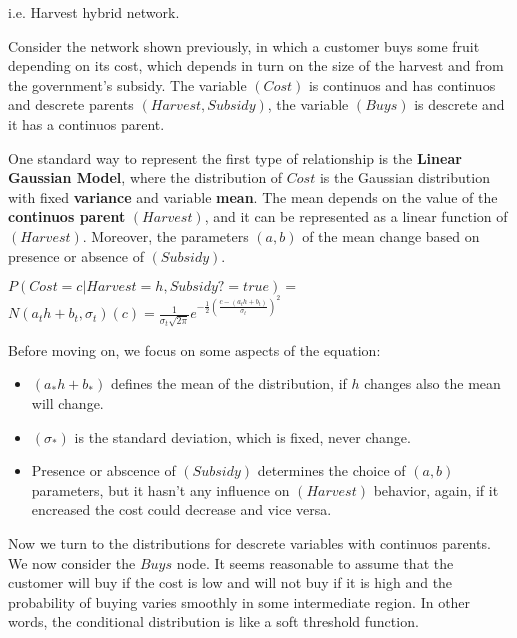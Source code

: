 \begin{example}
    i.e. Harvest hybrid network.

    \begin{center}
    \end{center}
    Consider the network shown previously, in which a customer buys some fruit depending on its cost, which depends in turn on the size of the harvest and from the 
    government's subsidy. The variable $(Cost)$ is continuos and has continuos and descrete parents $(Harvest, Subsidy)$, the variable $(Buys)$ is descrete and it has
    a continuos parent. \vspace{3.5pt}

    One standard way to represent the first type of relationship is the \textbf{Linear Gaussian Model}, where the distribution of $Cost$ is the Gaussian distribution 
    with fixed \textbf{variance} and variable \textbf{mean}. The mean depends on the value of the \textbf{continuos parent} $(Harvest)$, and it can be represented
    as a linear function of $(Harvest)$. Moreover, the parameters $(a, b)$ of the mean change based on presence or absence of $(Subsidy)$. \vspace{3.5pt}

    \begin{center}
        $P(Cost = c|Harvest = h, Subsidy ?= true) =$
        $N(a_th+b_t, \sigma_t)(c) = \frac{1}{\sigma_t\sqrt{2\pi}}e^{-\frac{1}{2}(\frac{c - (a_th+b_t)}{\sigma_t})^2}$
    \end{center} \vspace{7pt}
    Before moving on, we focus on some aspects of the equation:
    \begin{itemize}
        \renewcommand{\labelitemi}{-}
        \item $(a_*h+b_*)$ defines the mean of the distribution, if $h$ changes also the mean will change.
        \item $(\sigma_*)$ is the standard deviation, which is fixed, never change.
        \item Presence or abscence of $(Subsidy)$ determines the choice of $(a, b)$ parameters, but it hasn't any influence on $(Harvest)$ behavior, again,
        if it encreased the cost could decrease and vice versa.
    \end{itemize} \vspace{7pt}

    Now we turn to the distributions for descrete variables with continuos parents. We now consider the $Buys$ node. It seems reasonable to assume that the customer will buy if the cost is low 
    and will not buy if it is high and the probability of buying varies smoothly in some intermediate region. In other words, the conditional distribution is like a soft threshold function. \vspace{3.5pt}


\end{example}
